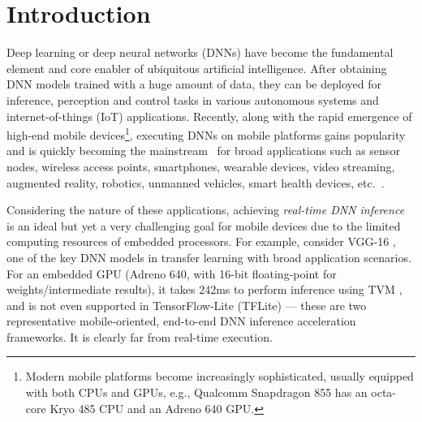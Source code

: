\documentclass[sigplan,screen]{acmart}
\begin{document}


\maketitle \section{Introduction}





Deep learning or deep neural networks (DNNs) have become the fundamental element and core enabler of ubiquitous artificial intelligence. 
After obtaining DNN models trained with 
a huge amount of data, 
they can be 
deployed for inference, perception and control tasks in various autonomous systems and internet-of-things (IoT) applications.
Recently, along with the rapid emergence of high-end mobile devices\footnote{Modern mobile platforms become increasingly sophisticated, usually equipped with both CPUs and GPUs, e.g., Qualcomm Snapdragon 855 \cite{snapdragon855} has an octa-core Kryo 485 CPU and an Adreno 640 GPU.}, executing DNNs on mobile platforms gains popularity and is quickly becoming the mainstream~\cite{deng2019deep,lane2016deepx,lane2017squeezing,ota2017deep,zhang2019deep}
for broad applications such as sensor nodes, wireless access points, smartphones, wearable devices, video streaming, augmented reality, robotics, unmanned vehicles, smart health devices, etc.~\cite{philipp2011sensor,lane2015early,boticki2010quiet,rodgers2014recent,bhattacharya2016smart}. 

Considering the nature of these applications, 
achieving {\em real-time DNN inference} is an ideal 
but yet a very challenging goal for mobile devices
due to the limited computing resources of embedded processors. 
For example, consider VGG-16 \cite{simonyan2014very}, one of the key DNN models in transfer learning with broad application scenarios. For an embedded GPU (Adreno 640, with 16-bit floating-point for weights/intermediate results), it takes 242ms to
perform inference using TVM \cite{chen2018tvm}, and is not even supported in TensorFlow-Lite (TFLite) \cite{TensorFlow-Lite} --- these are two representative mobile-oriented, end-to-end DNN inference acceleration frameworks. It is clearly far from 
real-time execution.
\end{document}
